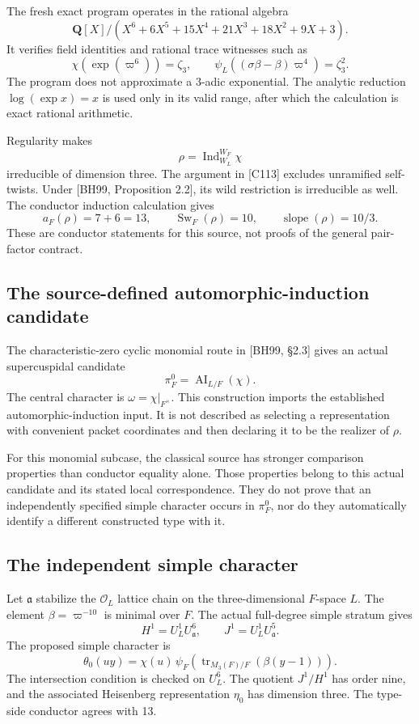\documentclass[11pt]{article}
\theoremstyle{definition}\newtheorem{definition}[proposition]{Definition}
\newcommand{\Ind}{\operatorname{Ind}}
\newcommand{\AI}{\operatorname{AI}}
\newcommand{\Sw}{\operatorname{Sw}}
\newcommand{\Q}{\mathbf Q}
\newcommand{\OO}{\mathcal O}
\begin{document}
The fresh exact program operates in the rational algebra
\[
 \Q[X]/(X^6+6X^5+15X^4+21X^3+18X^2+9X+3).
\]
It verifies field identities and rational trace witnesses such as
\[
 \chi(\exp(\varpi^6))=\zeta_3,\qquad
 \psi_L((\sigma\beta-\beta)\varpi^4)=\zeta_3^2.
\]
The program does not approximate a $3$-adic exponential. The analytic reduction $\log(\exp x)=x$ is used only in its valid range, after which the calculation is exact rational arithmetic.

Regularity makes
\[
 \rho=\Ind_{W_L}^{W_F}\chi
\]
irreducible of dimension three. The argument in [C113] excludes unramified self-twists. Under [BH99, Proposition 2.2], its wild restriction is irreducible as well. The conductor induction calculation gives
\[
 a_F(\rho)=7+6=13,\qquad \Sw_F(\rho)=10,
 \qquad \operatorname{slope}(\rho)=10/3.
 \tag{17.3}\label{eq:conductor}
\]
These are conductor statements for this source, not proofs of the general pair-factor contract.

\subsection{The source-defined automorphic-induction candidate}
The characteristic-zero cyclic monomial route in [BH99, \S2.3] gives an actual supercuspidal candidate
\[
 \pi_F^0=\AI_{L/F}(\chi).
 \tag{17.4}\label{eq:AI}
\]
The central character is $\omega=\chi|_{F^\times}$. This construction imports the established automorphic-induction input. It is not described as selecting a representation with convenient packet coordinates and then declaring it to be the realizer of $\rho$.

For this monomial subcase, the classical source has stronger comparison properties than conductor equality alone. Those properties belong to this actual candidate and its stated local correspondence. They do not prove that an independently specified simple character occurs in $\pi_F^0$, nor do they automatically identify a different constructed type with it.

\subsection{The independent simple character}
Let $\mathfrak a$ stabilize the $\OO_L$ lattice chain on the three-dimensional $F$-space $L$. The element $\beta=\varpi^{-10}$ is minimal over $F$. The actual full-degree simple stratum gives
\[
 H^1=U_L^1U_{\mathfrak a}^{6},\qquad
 J^1=U_L^1U_{\mathfrak a}^{5}.
\]
The proposed simple character is
\[
 \theta_0(uy)=\chi(u)\,
 \psi_F\!\left(\operatorname{tr}_{M_3(F)/F}(\beta(y-1))\right).
 \tag{17.5}\label{eq:theta0}
\]
The intersection condition is checked on $U_L^6$. The quotient $J^1/H^1$ has order nine, and the associated Heisenberg representation $\eta_0$ has dimension three. The type-side conductor agrees with 13.
\end{document}

